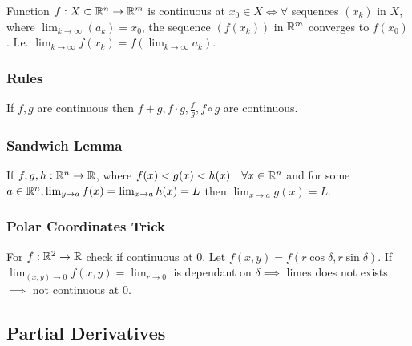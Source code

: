 Function $f: X \subset \mathbb{R}^n \to \mathbb{R}^m$ is continuous at $x_0 \in X \iff \forall$ sequences $(x_k)$ in $X$, where $\lim_{k \to \infty} (a_k) = x_0$, the sequence $(f(x_k))$ in $\mathbb{R}^m$ converges to $f(x_0)$. I.e. $\lim_{k \to \infty} f(x_k) = f(\lim_{k \to \infty} a_k)$.

\subsubsection{Rules}
If $f, g$ are continuous then $f + g, f \cdot g, \frac{f}{g}, f \circ g$ are continuous.

\subsubsection{Sandwich Lemma}
If $f, g, h: \mathbb{R}^n \to \mathbb{R}$, where $f(x) < g(x) < h(x) \quad \forall x \in \mathbb{R}^n$ and for some $a \in \mathbb{R}^n, \lim_{y \to a} f(x) = \lim_{x \to a} h(x) = L$ then $\lim_{x \to a} g(x) = L$.

\subsubsection{Polar Coordinates Trick}
For $f: \mathbb{R}^2 \to \mathbb{R}$ check if continuous at $0$. Let $f(x, y) = f(r \cos \delta, r \sin \delta)$. If $\lim_{(x, y) \to 0} f(x, y) = \lim_{r \to 0}$ is dependant on $\delta \implies$ limes does not exists $\implies$ not continuous at $0$.

\subsection{Partial Derivatives}
